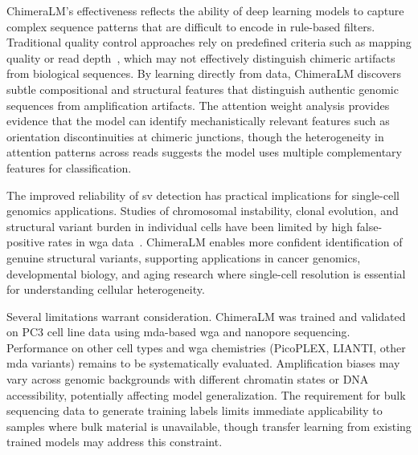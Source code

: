 \documentclass[pdflatex,sn-nature,lineno]{sn-jnl}%
\theoremstyle{thmstyleone}%
\theoremstyle{thmstyletwo}%
\theoremstyle{thmstylethree}%
\begin{document}
ChimeraLM's effectiveness reflects the ability of deep learning models to capture complex sequence patterns that are difficult to encode in rule-based filters. Traditional quality control approaches rely on predefined criteria such as mapping quality or read depth~\cite{kiguchi2021longread, lu2023exploration}, which may not effectively distinguish chimeric artifacts from biological sequences. By learning directly from data, ChimeraLM discovers subtle compositional and structural features that distinguish authentic genomic sequences from amplification artifacts. The attention weight analysis provides evidence that the model can identify mechanistically relevant features such as orientation discontinuities at chimeric junctions, though the heterogeneity in attention patterns across reads suggests the model uses multiple complementary features for classification.

The improved reliability of \gls{sv} detection has practical implications for single-cell genomics applications. Studies of chromosomal instability, clonal evolution, and structural variant burden in individual cells have been limited by high false-positive rates in \gls{wga} data~\cite{kosugi2019comprehensive, mahmoud2019structural}. ChimeraLM enables more confident identification of genuine structural variants, supporting applications in cancer genomics, developmental biology, and aging research where single-cell resolution is essential for understanding cellular heterogeneity.

Several limitations warrant consideration. ChimeraLM was trained and validated on PC3 cell line data using \gls{mda}-based \gls{wga} and nanopore sequencing. Performance on other cell types and \gls{wga} chemistries (PicoPLEX, LIANTI, other \gls{mda} variants) remains to be systematically evaluated. Amplification biases may vary across genomic backgrounds with different chromatin states or DNA accessibility, potentially affecting model generalization. The requirement for bulk sequencing data to generate training labels limits immediate applicability to samples where bulk material is unavailable, though transfer learning from existing trained models may address this constraint.

\end{document}
